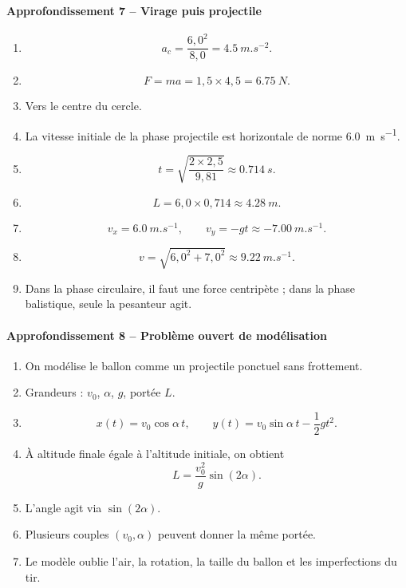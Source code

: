 \documentclass[11pt,a4paper]{article}
\theoremstyle{definition}
\begin{document}
\paragraph{Approfondissement 7 -- Virage puis projectile}
\begin{enumerate}[label=\arabic*.]
    \item
    \[
    a_c=\frac{6,0^2}{8,0}=\SI{4,5}{m.s^{-2}}.
    \]
    \item
    \[
    F=ma=1,5\times4,5=\SI{6,75}{N}.
    \]
    \item Vers le centre du cercle.
    \item La vitesse initiale de la phase projectile est horizontale de norme \SI{6,0}{m.s^{-1}}.
    \item
    \[
    t=\sqrt{\frac{2\times2,5}{9,81}}\approx \SI{0,714}{s}.
    \]
    \item
    \[
    L=6,0\times0,714\approx \SI{4,28}{m}.
    \]
    \item
    \[
    v_x=\SI{6,0}{m.s^{-1}},\qquad v_y=-gt\approx \SI{-7,00}{m.s^{-1}}.
    \]
    \item
    \[
    v=\sqrt{6,0^2+7,0^2}\approx \SI{9,22}{m.s^{-1}}.
    \]
    \item Dans la phase circulaire, il faut une force centripète ; dans la phase balistique, seule la pesanteur agit.
\end{enumerate}

\paragraph{Approfondissement 8 -- Problème ouvert de modélisation}
\begin{enumerate}[label=\arabic*.]
    \item On modélise le ballon comme un projectile ponctuel sans frottement.
    \item Grandeurs : $v_0$, $\alpha$, $g$, portée $L$.
    \item
    \[
    x(t)=v_0\cos\alpha\, t,\qquad
    y(t)=v_0\sin\alpha\, t-\frac12 gt^2.
    \]
    \item À altitude finale égale à l’altitude initiale, on obtient
    \[
    L=\frac{v_0^2}{g}\sin(2\alpha).
    \]
    \item L’angle agit via $\sin(2\alpha)$.
    \item Plusieurs couples $(v_0,\alpha)$ peuvent donner la même portée.
    \item Le modèle oublie l’air, la rotation, la taille du ballon et les imperfections du tir.
\end{enumerate}
\end{document}
